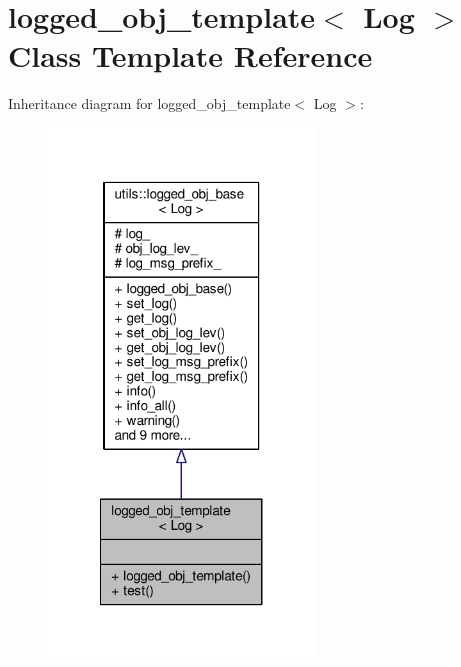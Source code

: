 \hypertarget{classlogged__obj__template}{\section{logged\-\_\-obj\-\_\-template$<$ Log $>$ Class Template Reference}
\label{classlogged__obj__template}
}


Inheritance diagram for logged\-\_\-obj\-\_\-template$<$ Log $>$\-:\nopagebreak
\begin{figure}[H]
\begin{center}
\leavevmode
\includegraphics[width=200pt]{classlogged__obj__template__inherit__graph}
\end{center}
\end{figure}


